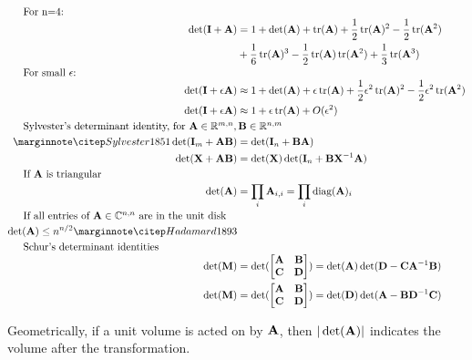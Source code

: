 \begin{align}
\noalign{For n=4:}
\det(\mI+\mA)      &= 1 + \det(\mA)+\trace(\mA) + \frac{1}{2}\trace(\mA)^2-\frac{1}{2}\trace(\mA^2)  \\
                   &    + \frac{1}{6}\trace(\mA)^3-\frac{1}{2}\trace(\mA)\trace(\mA^2)+\frac{1}{3}\trace(\mA^3) \\
\noalign{For small $\epsilon$:}
\det(\mI+\epsilon\mA) &\approx 1 + \det(\mA) + \epsilon\trace(\mA)+\frac{1}{2}\epsilon^2\trace(\mA)^2-\frac{1}{2}\epsilon^2\trace(\mA^2) \\ %
\det(\mI+\epsilon\mA) &\approx 1 + \epsilon\trace(\mA) + O(\epsilon^2) \\ %
\noalign{Sylvester's determinant identity, for $\mA\in\sRmn, \mB\in\sRnm$}
\eqcite{Sylvester1851}
\det(\mI_m+\mA\mB) &= \det(\mI_n+\mB\mA)                    \\
\det(\mX+\mA\mB)   &= \det(\mX)\det(\mI_n + \mB\mX^{-1}\mA) \\
\noalign{If $\mA$ is triangular}
\det(\mA) &= \prod_i \mA_{i,i} = \prod_i \diag(\mA)_i \\
\noalign{If all entries of $\mA\in\sCnn$ are in the unit disk}
\det(\mA)\le n^{n/2} \eqcite{Hadamard1893} \\
\noalign{Schur's determinant identities}
\det(\mM) &= \det(\begin{bmatrix} \mA & \mB \\ \mC & \mD \end{bmatrix}) = \det(\mA) \det(\mD -\mC \mA^{-1}\mB) \\
\det(\mM) &= \det(\begin{bmatrix} \mA & \mB \\ \mC & \mD \end{bmatrix}) = \det(\mD) \det(\mA -\mB \mD^{-1}\mC) \\
\end{align}

Geometrically, if a unit volume is acted on by $\mathbf{A}$, then $|\det(\mathbf{A})|$ indicates the volume after the transformation.


